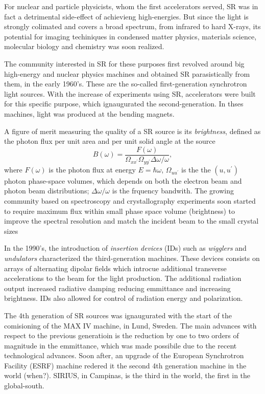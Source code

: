 For nuclear and particle physicists, whom the first accelerators served, SR was in fact a detrimental side-effect of achievieng high-energies. But since the light is strongly colimated and covers a broad spectrum, from infrared to hard X-rays, its potential for imaging techiniques in condensed matter physics, materials science, molecular biology and chemistry was soon realized.

The community interested in SR for these purposes first revolved around big high-energy and nuclear physics machines and obtained SR parasistically from them, in the early 1960's. These are the so-called first-generation synchrotron light sources. With the increase of experiments using SR, accelerators were built for this specific purpose, which ignaugurated the second-generation. In thses machines, light was produced at the bending magnets.

A figure of merit measuring the quality of a SR source is its \textit{brightness}, defined as the photon flux per unit area and per unit solid angle at the source
\begin{equation}
    B(\omega) = \frac{F(\omega)}{\Omega_{xx^\prime}\Omega_{yy^\prime}\Delta \omega/\omega},
\end{equation}
where $F(\omega)$ is the photon flux at energy $E=\hbar\omega$, $\Omega_{uu^\prime}$ is the the $(u,u^\prime)$ photon phase-space volumes, which depends on both the electron beam and photon beam distributions; $\Delta\omega/\omega$ is the frquency bandwith.
The growing community based on spectroscopy and crystallography experiments  soon started to require  maximum flux within small phase space volume  (brightness) to improve the spectral resolution and match  the incident beam to the small crystal sizes


In the 1990's, the introduction of \textit{insertion devices} (IDs) such as \textit{wigglers} and \textit{undulators} characterized the third-generation machines. These devices consists on arrays of alternating dipolar fields which introcue additional transverse accelerations to the beam for the light production. The additional radiation output increased radiative damping reducing emmittance and increasing brightness. IDs also allowed for control of radiation energy and polarization.


The 4th generation of SR sources was ignaugurated with the start of the comisioning of the MAX IV machine, in Lund, Sweden. The main advances with respect to the previous generatioin is the reduction by one to two orders of magnitude in the emmittance, which was made possibile due to the recent technological advances. Soon after, an upgrade of the European Synchrotron Facility (ESRF) machine redered it the second 4th generation machine in the world (when?). SIRIUS, in Campinas, is the third in the world, the first in the global-south.

